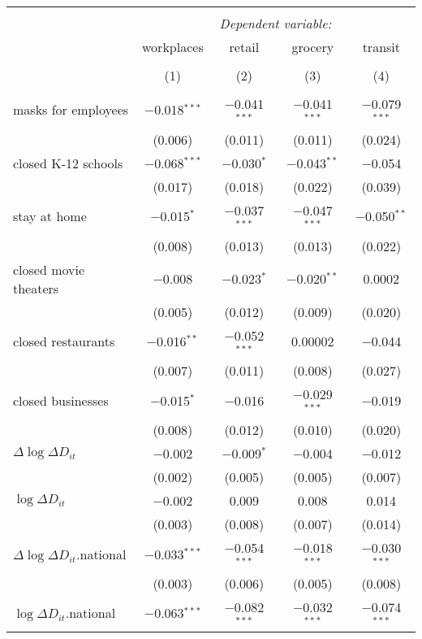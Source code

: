 \begin{tabular}{@{\extracolsep{1pt}}lcccc} 
\\[-1.8ex]\hline 
\hline \\[-1.8ex] 
 & \multicolumn{4}{c}{\textit{Dependent variable:}} \\ 
\cline{2-5} 
 & workplaces & retail & grocery & transit \\ 
\\[-1.8ex] & (1) & (2) & (3) & (4)\\ 
\hline \\[-1.8ex] 
 masks for employees & $-$0.018$^{***}$ & $-$0.041$^{***}$ & $-$0.041$^{***}$ & $-$0.079$^{***}$ \\ 
  & (0.006) & (0.011) & (0.011) & (0.024) \\ 
  closed K-12 schools & $-$0.068$^{***}$ & $-$0.030$^{*}$ & $-$0.043$^{**}$ & $-$0.054 \\ 
  & (0.017) & (0.018) & (0.022) & (0.039) \\ 
  stay at home & $-$0.015$^{*}$ & $-$0.037$^{***}$ & $-$0.047$^{***}$ & $-$0.050$^{**}$ \\ 
  & (0.008) & (0.013) & (0.013) & (0.022) \\ 
  closed movie theaters & $-$0.008 & $-$0.023$^{*}$ & $-$0.020$^{**}$ & 0.0002 \\ 
  & (0.005) & (0.012) & (0.009) & (0.020) \\ 
  closed restaurants & $-$0.016$^{**}$ & $-$0.052$^{***}$ & 0.00002 & $-$0.044 \\ 
  & (0.007) & (0.011) & (0.008) & (0.027) \\ 
  closed businesses & $-$0.015$^{*}$ & $-$0.016 & $-$0.029$^{***}$ & $-$0.019 \\ 
  & (0.008) & (0.012) & (0.010) & (0.020) \\ 
  $\Delta \log \Delta D_{it}$ & $-$0.002 & $-$0.009$^{*}$ & $-$0.004 & $-$0.012 \\ 
  & (0.002) & (0.005) & (0.005) & (0.007) \\ 
  $\log \Delta D_{it}$ & $-$0.002 & 0.009 & 0.008 & 0.014 \\ 
  & (0.003) & (0.008) & (0.007) & (0.014) \\ 
  $\Delta \log \Delta D_{it}$.national & $-$0.033$^{***}$ & $-$0.054$^{***}$ & $-$0.018$^{***}$ & $-$0.030$^{***}$ \\ 
  & (0.003) & (0.006) & (0.005) & (0.008) \\ 
  $\log \Delta D_{it}$.national & $-$0.063$^{***}$ & $-$0.082$^{***}$ & $-$0.032$^{***}$ & $-$0.074$^{***}$ \\ 

\end{tabular}
